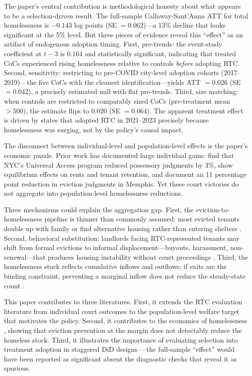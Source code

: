 \documentclass[12pt]{article}
\begin{document}
The paper's central contribution is methodological honesty about what appears to be a selection-driven result. The full-sample Callaway-Sant'Anna ATT for total homelessness is $-0.143$ log points (SE $= 0.062$)---a 13\% decline that looks significant at the 5\% level. But three pieces of evidence reveal this ``effect'' as an artifact of endogenous adoption timing. First, pre-trends: the event-study coefficient at $t-3$ is $0.164$ and statistically significant, indicating that treated CoCs experienced rising homelessness relative to controls \textit{before} adopting RTC. Second, sensitivity: restricting to pre-COVID city-level adoption cohorts (2017--2019)---the five CoCs with the cleanest identification---yields ATT $= 0.026$ (SE $= 0.042$), a precisely estimated null with flat pre-trends. Third, size matching: when controls are restricted to comparably sized CoCs (pre-treatment mean $> 500$), the estimate flips to $0.020$ (SE $= 0.064$). The apparent treatment effect is driven by states that adopted RTC in 2021--2023 precisely because homelessness was surging, not by the policy's causal impact.

The disconnect between individual-level and population-level effects is the paper's economic puzzle. Prior work has documented large individual gains: \citet{cassidy2022} find that NYC's Universal Access program reduced possessory judgments by 3\%, \citet{collinson2023} show equilibrium effects on rents and tenant retention, and \citet{caspi2025} document an 11 percentage point reduction in eviction judgments in Memphis. Yet these court victories do not aggregate into population-level homelessness reductions.

Three mechanisms could explain the aggregation gap. First, the eviction-to-homelessness pipeline is thinner than commonly assumed: most evicted tenants double up with family or find alternative housing rather than entering shelters \citep{desmond2016, humphries2019}. Second, behavioral substitution: landlords facing RTC-represented tenants may shift from formal evictions to informal displacement---buyouts, harassment, non-renewal---that produces housing instability without court proceedings \citep{gromis2022}. Third, the homelessness stock reflects cumulative inflows and outflows; if exits are the binding constraint, preventing a marginal inflow does not reduce the steady-state count \citep{obrien2020, corinth2018}.

This paper contributes to three literatures. First, it extends the RTC evaluation literature \citep{cassidy2022, collinson2023, caspi2025, ellen2020, seron2001, greiner2013} from individual court outcomes to the population-level welfare target that motivates the policy. Second, it contributes to the economics of homelessness \citep{obrien2020, corinth2018, quigley2001, hanratty2017}, showing that eviction prevention at the margin does not detectably reduce the homeless stock. Third, it illustrates the importance of evaluating selection into treatment adoption in staggered DiD designs \citep{goodmanbacon2021, callaway2021}---the full-sample ``effect'' would have been reported as significant absent the diagnostic checks that reveal it as spurious.
\end{document}
